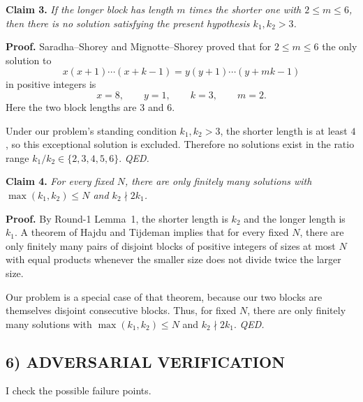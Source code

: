 \medskip
\noindent\textbf{Claim 3.}
\emph{If the longer block has length $m$ times the shorter one with $2\le m\le 6$, then there is no solution satisfying the present hypothesis $k_1,k_2>3$.}

\medskip
\noindent\textbf{Proof.}
Saradha--Shorey and Mignotte--Shorey proved that for $2\le m\le 6$ the only solution to
\[
x(x+1)\cdots(x+k-1)=y(y+1)\cdots(y+mk-1)
\]
in positive integers is
\[
x=8,\qquad y=1,\qquad k=3,\qquad m=2.
\]
Here the two block lengths are $3$ and $6$.

Under our problem's standing condition $k_1,k_2>3$, the shorter length is at least $4$, so this exceptional solution is excluded.  Therefore no solutions exist in the ratio range $k_1/k_2\in\{2,3,4,5,6\}$.
\hfill\textit{QED.}

\medskip
\noindent\textbf{Claim 4.}
\emph{For every fixed $N$, there are only finitely many solutions with $\max(k_1,k_2)\le N$ and $k_2\nmid 2k_1$.}

\medskip
\noindent\textbf{Proof.}
By Round-1 Lemma~1, the shorter length is $k_2$ and the longer length is $k_1$.
A theorem of Hajdu and Tijdeman implies that for every fixed $N$, there are only finitely many pairs of disjoint blocks of positive integers of sizes at most $N$ with equal products whenever the smaller size does not divide twice the larger size.

Our problem is a special case of that theorem, because our two blocks are themselves disjoint consecutive blocks.
Thus, for fixed $N$, there are only finitely many solutions with $\max(k_1,k_2)\le N$ and $k_2\nmid 2k_1$.
\hfill\textit{QED.}

\subsection*{6) ADVERSARIAL VERIFICATION}

I check the possible failure points.

